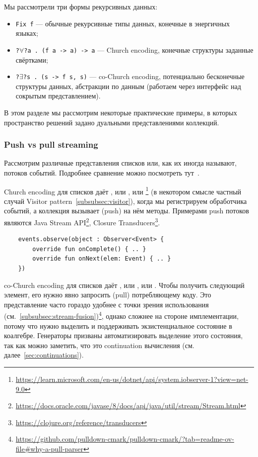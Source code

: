 Мы рассмотрели три формы рекурсивных данных:
\begin{itemize}
    \item \texttt{Fix f} --- обычные рекурсивные типы данных, конечные в энергичных языках;
    \item \texttt{?$\forall$?a . (f a -> a) -> a} --- Church encoding, конечные структуры заданные свёртками;
    \item \texttt{?$\exists$?s . (s -> f s, s)} --- co-Church encoding, потенциально бесконечные структуры данных, абстракции по данным (работаем через интерфейс над сокрытым представлением).
\end{itemize}

В этом разделе мы рассмотрим некоторые практические примеры, в которых пространство решений задано дуальными представлениями коллекций.

\subsubsection{Push vs pull streaming} \label{subsubsec:push-pull}

Рассмотрим различные представления списков или, как их иногда называют, потоков событий.
Подробнее сравнение можно посмотреть тут~\cite[параграф 3]{kiselyov2017stream}.

Church encoding для списков даёт , или , или \footnote{\url{https://learn.microsoft.com/en-us/dotnet/api/system.iobserver-1?view=net-9.0}} (в некотором смысле частный случай Visitor pattern~\ref{subsubsec:visitor}), когда мы регистрируем обработчика событий, а коллекция вызывает (push) на нём методы.
Примерами push потоков являются Java Stream API\footnote{\url{https://docs.oracle.com/javase/8/docs/api/java/util/stream/Stream.html}}, Closure Transducers\footnote{\url{https://clojure.org/reference/transducers}}.
\begin{verbatim}
    events.observe(object : Observer<Event> {
        override fun onComplete() { .. }
        override fun onNext(elem: Event) { .. }
    })
\end{verbatim}

co-Church encoding для списков даёт , или , или .
Чтобы получить следующий элемент, его нужно явно запросить (pull) потребляющему коду.
Это представление часто гораздо удобнее с точки зрения использования (см.~\ref{subsubsec:stream-fusion})\footnote{\url{https://github.com/pulldown-cmark/pulldown-cmark/?tab=readme-ov-file\#why-a-pull-parser}}, однако сложнее на стороне имплементации, потому что нужно выделить и поддерживать экзистенциальное состояние в коалгебре.
Генераторы призваны автоматизировать выделение этого состояния, так как можно заметить, что это continuation вычисления (см. далее~\ref{sec:continuations}).

